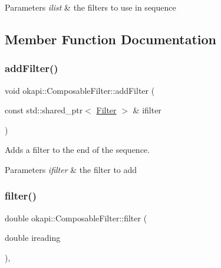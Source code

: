 \begin{DoxyParams}{Parameters}
{\em ilist} & the filters to use in sequence \\
\hline
\end{DoxyParams}


\subsection{Member Function Documentation}
\mbox{\label{classokapi_1_1ComposableFilter_a61d20215a1d89357c8720d04b23a31ed}} 
\subsubsection{\texorpdfstring{addFilter()}{addFilter()}}
{\footnotesize\ttfamily void okapi\+::\+Composable\+Filter\+::add\+Filter (\begin{DoxyParamCaption}\item[{const std\+::shared\+\_\+ptr$<$ \mbox{\hyperlink{classokapi_1_1Filter}{Filter}} $>$ \&}]{ifilter }\end{DoxyParamCaption})\hspace{0.3cm}{\ttfamily [virtual]}}

Adds a filter to the end of the sequence.


\begin{DoxyParams}{Parameters}
{\em ifilter} & the filter to add \\
\hline
\end{DoxyParams}
\mbox{\label{classokapi_1_1ComposableFilter_a76925f04dcd186b249e5bfb169f27992}} 
\subsubsection{\texorpdfstring{filter()}{filter()}}
{\footnotesize\ttfamily double okapi\+::\+Composable\+Filter\+::filter (\begin{DoxyParamCaption}\item[{double}]{ireading }\end{DoxyParamCaption})\hspace{0.3cm}{\ttfamily [override]}, {\ttfamily [virtual]}}

